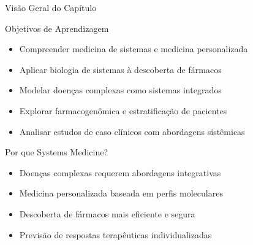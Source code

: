 \begin{frame}{Visão Geral do Capítulo}
\begin{block}{Objetivos de Aprendizagem}
\begin{itemize}
    \item Compreender medicina de sistemas e medicina personalizada
    \item Aplicar biologia de sistemas à descoberta de fármacos
    \item Modelar doenças complexas como sistemas integrados
    \item Explorar farmacogenômica e estratificação de pacientes
    \item Analisar estudos de caso clínicos com abordagens sistêmicas
\end{itemize}
\end{block}

\vspace{0.3cm}

\begin{exampleblock}{Por que Systems Medicine?}
\begin{itemize}
    \item Doenças complexas requerem abordagens integrativas
    \item Medicina personalizada baseada em perfis moleculares
    \item Descoberta de fármacos mais eficiente e segura
    \item Previsão de respostas terapêuticas individualizadas
\end{itemize}
\end{exampleblock}
\end{frame}

